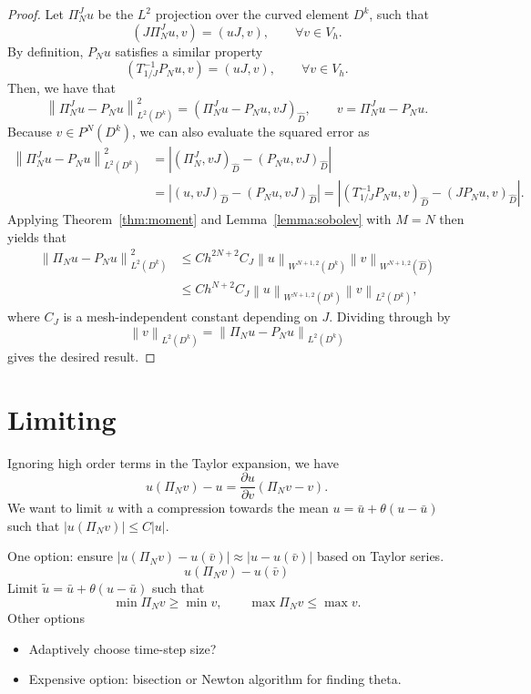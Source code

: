 \documentclass[preprint,10pt]{article}
\theoremstyle{definition}
\theoremstyle{lemma}
\theoremstyle{theorem}
\theoremstyle{assumption}
\renewcommand{\hat}{\widehat}
\newcommand{\pd}[2]{\frac{\partial#1}{\partial#2}}
\newcommand{\nor}[1]{\left\| #1 \right\|}
\newcommand{\LRp}[1]{\left( #1 \right)}
\newcommand{\LRb}[1]{\left| #1 \right|}
\begin{document}
\begin{proof}
Let $\Pi_N^J u$ be the $L^2$ projection over the curved element $D^k$, such that
\[
\LRp{J\Pi_N^J u,v} = \LRp{u J,v}, \qquad \forall v\in V_h.
\]
By definition, $P_N u$ satisfies a similar property
\[
\LRp{T_{1/J}^{-1} P_N u,v} = \LRp{u J,v}, \qquad \forall v\in V_h.
\]
Then, we have that
\[
\nor{\Pi_N^J  u - P_N u}_{L^2\LRp{D^k}}^2 = \LRp{\Pi_N^J  u - P_N u,vJ}_{\hat{D}}, \qquad v = \Pi_N^J  u - P_N u.
\]
Because $v \in P^N\LRp{D^k}$, we can also evaluate the squared error as
\begin{align*}
\nor{\Pi_N^J  u - P_N u}_{L^2\LRp{D^k}}^2 &= \LRb{\LRp{\Pi_N^J ,vJ}_{\hat{D}} - \LRp{P_N u,vJ}_{\hat{D}}}\\
& = \LRb{\LRp{u,vJ}_{\hat{D}} - \LRp{P_N u,vJ}_{\hat{D}}} = \LRb{\LRp{T_{1/J}^{-1}P_N u,v}_{\hat{D}} - \LRp{JP_N u,v}_{\hat{D}}}.
\end{align*}
Applying Theorem~\ref{thm:moment} and Lemma~\ref{lemma:sobolev} with $M=N$ then yields that 
\begin{align*}
\nor{\Pi_N u - P_N u}_{L^2\LRp{D^k}}^2 &\leq Ch^{2N+2} C_J\nor{u}_{W^{N+1,2}\LRp{D^k}}
\nor{v}_{W^{N+1,2}\LRp{\hat{D}}} \\
&\leq Ch^{N+2} C_J\nor{u}_{W^{N+1,2}\LRp{D^k}}\nor{v}_{L^2\LRp{D^k}},
\end{align*}
where $C_J$ is a mesh-independent constant depending on $J$.  Dividing through by 
\[
\nor{v}_{L^2\LRp{D^k}} = \nor{\Pi_N u - P_N u}_{L^2\LRp{D^k}}
\]
 gives the desired result.  %
\end{proof}

\section{Limiting}

Ignoring high order terms in the Taylor expansion, we have
\[
u\LRp{\Pi_N v} - u = \pd{u}{v} \LRp{\Pi_Nv - v}.
\]
We want to limit $u$ with a compression towards the mean $u = \bar{u} + \theta(u-\bar{u})$ such that $\LRb{u\LRp{\Pi_N v}} \leq C\LRb{u}$.  

One option: ensure $\LRb{u\LRp{\Pi_N v} - u(\bar{v})} \approx \LRb{u - u(\bar{v})}$ based on Taylor series. 
\[
u\LRp{\Pi_N v} - u(\bar{v})
\]
Limit $\tilde{u} = \bar{u} + \theta(u-\bar{u})$ such that 
\[
\min \Pi_N v \geq \min v, \qquad \max \Pi_N v \leq \max v.
\]
Other options
\begin{itemize}
\item Adaptively choose time-step size?
\item Expensive option: bisection or Newton algorithm for finding theta.  
\end{itemize}





\end{document}
